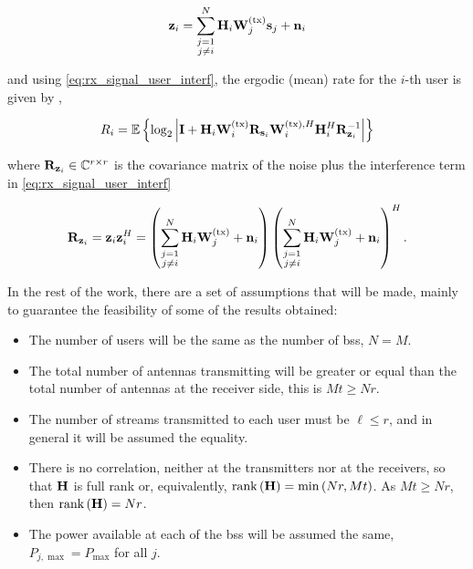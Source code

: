 \begin{equation} \label{eq:interf_plus_noise}
    \mathbf{z}_i = \sum\limits_{\substack{j = 1\\j \neq i}}^{N} \mathbf{H}_i \mathbf{W}^{(\text{tx})}_j
    \mathbf{s}_j + \mathbf{n}_i
\end{equation}

\noindent
and using \eqref{eq:rx_signal_user_interf}, the ergodic (mean) rate for the
$i$-th user is given by \cite{cover_thomas}, \cite{holter01}

\begin{equation} \label{eq:generic_ergodic_capacity}
    R_i = \mathbb{E}\left\{
        \log_2\left| \mathbf{I} + \mathbf{H}_i\mathbf{W}^{(\text{tx})}_i\mathbf{R}_{\mathbf{s}_i}\mathbf{W}^{(\text{tx}),H}_i\mathbf{H}_i^H \mathbf{R}_{\mathbf{z}_i}^{-1}
    \right|
    \right\}
\end{equation}

\noindent
where $\mathbf{R}_{\mathbf{z}_i} \in \mathbb{C}^{r \times r}$ is the covariance matrix of the noise
plus the interference term in \eqref{eq:rx_signal_user_interf}

\begin{equation} \label{eq:r_in}
    \mathbf{R}_{\mathbf{z}_i} = \mathbf{z}_i \mathbf{z}_i^H = 
    \left(\sum\limits_{\substack{j=1\\j\neq i}}^{N} \mathbf{H}_i\mathbf{W}^{(\text{tx})}_j+\mathbf{n}_i
    \right)
    \left(\sum\limits_{\substack{j=1\\j\neq i}}^{N} \mathbf{H}_i\mathbf{W}^{(\text{tx})}_j+\mathbf{n}_i
    \right)^H.
\end{equation}

In the rest of the work, there are a set of assumptions that will be made,
mainly to guarantee the feasibility of some of the results obtained:

\begin{itemize}
    \item The number of users will be the same as the number of \glspl{bs},
        \ie $N = M$.
    \item The total number of antennas transmitting will be greater or equal
        than the total number of antennas at the receiver side, this is $Mt
		\geq Nr$.
    \item The number of streams transmitted to each user must be $\ell \leq r$,
        and in general it will be assumed the equality.
    \item There is no correlation, neither at the transmitters nor at the
        receivers, so that $\mathbf{H}$ is full rank or, equivalently, $\operatorname*{rank}\left(
        \mathbf{H}\right) = \min\left(Nr,Mt\right)$. As $Mt \geq Nr$, then $\operatorname*{rank}\left(
        \mathbf{H}\right) = Nr$.
    \item The power available at each of the \glspl{bs} will be assumed the
        same, \ie $P_{j, \max} = P_{\max}$ for all $j$.
\end{itemize}

